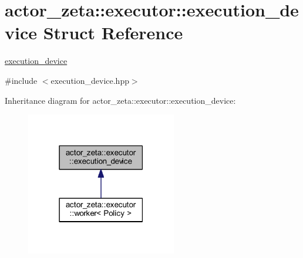 \hypertarget{structactor__zeta_1_1executor_1_1execution__device}{}\section{actor\+\_\+zeta\+:\+:executor\+:\+:execution\+\_\+device Struct Reference}
\label{structactor__zeta_1_1executor_1_1execution__device}


\hyperlink{structactor__zeta_1_1executor_1_1execution__device}{execution\+\_\+device}  




{\ttfamily \#include $<$execution\+\_\+device.\+hpp$>$}



Inheritance diagram for actor\+\_\+zeta\+:\+:executor\+:\+:execution\+\_\+device\+:\nopagebreak
\begin{figure}[H]
\begin{center}
\leavevmode
\includegraphics[width=186pt]{structactor__zeta_1_1executor_1_1execution__device__inherit__graph}
\end{center}
\end{figure}
